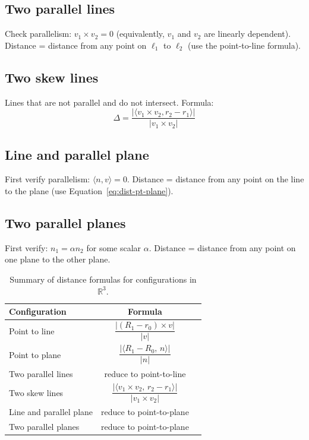 \documentclass[11pt,a4paper]{article}
\theoremstyle{plain}
\theoremstyle{definition}
\theoremstyle{remark}
\newcommand{\R}{\mathbb{R}}
\newcommand{\rthree}{$\R^3$}
\newcommand{\ip}[2]{\langle #1,\, #2 \rangle}
\begin{document}
\subsection{Two parallel lines}

Check parallelism: $v_1 \times v_2 = 0$ (equivalently, $v_1$ and $v_2$ are linearly dependent).
Distance = distance from any point on $\ell_1$ to $\ell_2$ (use the point-to-line formula).

\subsection{Two skew lines}

Lines that are not parallel and do not intersect. Formula:
\[
\Delta = \frac{|\langle v_1 \times v_2, r_2 - r_1 \rangle|}{|v_1 \times v_2|}
\]

\subsection{Line and parallel plane}

First verify parallelism: $\langle n, v \rangle = 0$.
Distance = distance from any point on the line to the plane (use Equation~\eqref{eq:dist-pt-plane}).

\subsection{Two parallel planes}

First verify: $n_1 = \alpha n_2$ for some scalar $\alpha$.
Distance = distance from any point on one plane to the other plane.

\begin{table}[H]
\centering
\begin{tabular}{|l || c | c|}
\hline
\textbf{Configuration} & \textbf{Formula} \\
\hline
\hline
Point to line & $\dfrac{|(R_1 - r_0) \times v|}{|v|}$ \\[10pt]
\hline
Point to plane & $\dfrac{|\ip{R_1 - R_0}{n}|}{|n|}$ \\[10pt]
\hline
Two parallel lines & reduce to point-to-line \\[4pt]
\hline
Two skew lines & $\dfrac{|\ip{v_1 \times v_2}{r_2 - r_1}|}{|v_1 \times v_2|}$ \\[10pt]
\hline
Line and parallel plane & reduce to point-to-plane \\[4pt]
\hline
Two parallel planes & reduce to point-to-plane \\[4pt]
\hline
\end{tabular}
\caption{Summary of distance formulas for configurations in \rthree.}
\label{tab:distances}
\end{table}
\end{document}
